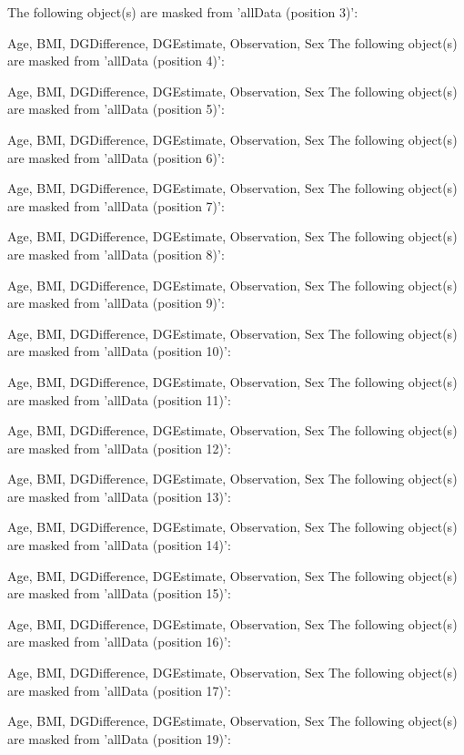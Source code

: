 \begin{Schunk}
	\begin{Soutput}
		The following object(s) are masked from 'allData (position 3)':

		Age, BMI, DGDifference, DGEstimate, Observation, Sex
		The following object(s) are masked from 'allData (position 4)':

		Age, BMI, DGDifference, DGEstimate, Observation, Sex
		The following object(s) are masked from 'allData (position 5)':

		Age, BMI, DGDifference, DGEstimate, Observation, Sex
		The following object(s) are masked from 'allData (position 6)':

		Age, BMI, DGDifference, DGEstimate, Observation, Sex
		The following object(s) are masked from 'allData (position 7)':

		Age, BMI, DGDifference, DGEstimate, Observation, Sex
		The following object(s) are masked from 'allData (position 8)':

		Age, BMI, DGDifference, DGEstimate, Observation, Sex
		The following object(s) are masked from 'allData (position 9)':

		Age, BMI, DGDifference, DGEstimate, Observation, Sex
		The following object(s) are masked from 'allData (position 10)':

		Age, BMI, DGDifference, DGEstimate, Observation, Sex
		The following object(s) are masked from 'allData (position 11)':

		Age, BMI, DGDifference, DGEstimate, Observation, Sex
		The following object(s) are masked from 'allData (position 12)':

		Age, BMI, DGDifference, DGEstimate, Observation, Sex
		The following object(s) are masked from 'allData (position 13)':

		Age, BMI, DGDifference, DGEstimate, Observation, Sex
		The following object(s) are masked from 'allData (position 14)':

		Age, BMI, DGDifference, DGEstimate, Observation, Sex
		The following object(s) are masked from 'allData (position 15)':

		Age, BMI, DGDifference, DGEstimate, Observation, Sex
		The following object(s) are masked from 'allData (position 16)':

		Age, BMI, DGDifference, DGEstimate, Observation, Sex
		The following object(s) are masked from 'allData (position 17)':

		Age, BMI, DGDifference, DGEstimate, Observation, Sex
		The following object(s) are masked from 'allData (position 19)':


\end{Soutput}
\end{Schunk}
